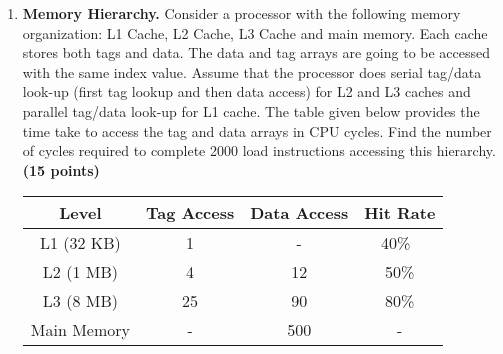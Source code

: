 \documentclass[a4paper, 11pt]{exam}
\begin{document}
\begin{enumerate}
\begin{enumerate}
\end{enumerate}



\item \textbf {Memory Hierarchy.}
Consider a processor with the following memory
organization: L1 Cache, L2 Cache, L3 Cache and main memory. Each cache stores both tags
and data. The data and tag arrays are going to be accessed with the same index value. Assume
that the processor does serial tag/data look-up (first tag lookup and then data access) for L2
and L3 caches and parallel tag/data look-up for L1 cache. The table given below provides the
time take to access the tag and data arrays in CPU cycles. 
Find the number of cycles required to complete 2000 load instructions accessing this
hierarchy.\textbf{(15 points)}

\begin{center}
	\begin{tabular}{ |c|c|c|c| } 
		\hline
		\textbf{Level}& \textbf{Tag Access}& \textbf{Data Access} & \textbf{Hit Rate}\\ 
		\hline
		L1 (32 KB) & 1 & -  & 40\%\ \\ 
		L2 (1 MB) & 4 & 12  & 50\% \\ 
		L3 (8 MB) & 25 & 90  & 80\%\\ 
		\hline
		Main Memory & - & 500  & - \\ 
		\hline
	\end{tabular}
\end{center}


\end{enumerate}
\end{document}
